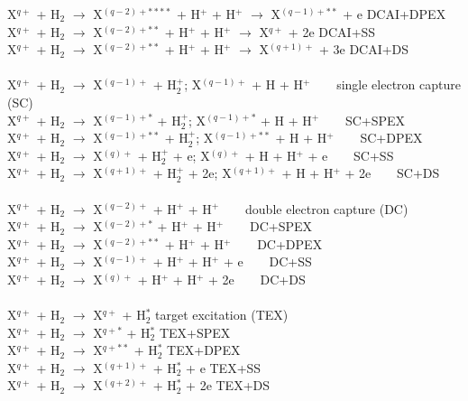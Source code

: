 \documentclass[draft]{agujournal2018}
\begin{document}
\begin{tabbing}
\> X$^{q+}$ + H$_2$ $\rightarrow$ X$^{(q-2)+****}$ + H$^+$ + H$^+$ $\rightarrow$ X$^{(q-1)+**}$ + e  \>  \> DCAI+DPEX \\
\> X$^{q+}$ + H$_2$ $\rightarrow$ X$^{(q-2)+**}$ + H$^+$ + H$^+$ $\rightarrow$ X$^{q+}$ + 2e  \>  \> DCAI+SS \\
\> X$^{q+}$ + H$_2$ $\rightarrow$ X$^{(q-2)+**}$ + H$^+$ + H$^+$ $\rightarrow$ X$^{(q+1)+}$ + 3e  \>  \> DCAI+DS \\
\\
\> X$^{q+}$ + H$_2$ $\rightarrow$ X$^{(q-1)+}$ + H$_2^+$;  X$^{(q-1)+}$ + H + H$^+$ \> $\;\;\;\;\;$ \> single electron capture (SC) \\
\> X$^{q+}$ + H$_2$ $\rightarrow$ X$^{(q-1)+*}$ + H$_2^+$;  X$^{(q-1)+*}$ + H + H$^+$ \> $\;\;\;\;\;$ \> SC+SPEX \\
\> X$^{q+}$ + H$_2$ $\rightarrow$ X$^{(q-1)+**}$ + H$_2^+$;  X$^{(q-1)+**}$ + H + H$^+$ \> $\;\;\;\;\;$ \> SC+DPEX \\
\> X$^{q+}$ + H$_2$ $\rightarrow$ X$^{(q)+}$ + H$_2^+$ + e;  X$^{(q)+}$ + H + H$^+$ + e \> $\;\;\;\;\;$ \> SC+SS \\
\> X$^{q+}$ + H$_2$ $\rightarrow$ X$^{(q+1)+}$ + H$_2^+$ + 2e;  X$^{(q+1)+}$ + H + H$^+$ + 2e \> $\;\;\;\;\;$ \> SC+DS \\
\\
\> X$^{q+}$ + H$_2$ $\rightarrow$ X$^{(q-2)+}$ + H$^+$ + H$^+$ \> $\;\;\;\;\;$ \> double electron capture (DC) \\
\> X$^{q+}$ + H$_2$ $\rightarrow$ X$^{(q-2)+*}$ + H$^+$ + H$^+$ \> $\;\;\;\;\;$ \> DC+SPEX \\
\> X$^{q+}$ + H$_2$ $\rightarrow$ X$^{(q-2)+**}$ + H$^+$ + H$^+$ \> $\;\;\;\;\;$ \> DC+DPEX \\
\> X$^{q+}$ + H$_2$ $\rightarrow$ X$^{(q-1)+}$ + H$^+$ + H$^+$ + e \> $\;\;\;\;\;$ \> DC+SS \\
\> X$^{q+}$ + H$_2$ $\rightarrow$ X$^{(q)+}$ + H$^+$ + H$^+$ + 2e \> $\;\;\;\;\;$ \> DC+DS \\
\\
\> X$^{q+}$ + H$_2$ $\rightarrow$ X$^{q+}$ + H$_2^*$  \> \> target excitation (TEX) \\
\> X$^{q+}$ + H$_2$ $\rightarrow$ X$^{q+*}$ + H$_2^*$  \> \> TEX+SPEX \\
\> X$^{q+}$ + H$_2$ $\rightarrow$ X$^{q+**}$ + H$_2^*$  \> \> TEX+DPEX \\
\> X$^{q+}$ + H$_2$ $\rightarrow$ X$^{(q+1)+}$ + H$_2^*$ + e  \> \> TEX+SS \\
\> X$^{q+}$ + H$_2$ $\rightarrow$ X$^{(q+2)+}$ + H$_2^*$ + 2e \> \> TEX+DS
\end{tabbing}
\end{document}
